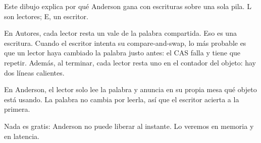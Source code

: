 Este dibujo explica por qué Anderson gana con escrituras sobre una sola pila. L son lectores; E, un escritor.

En Autores, cada lector resta un vale de la palabra compartida. Eso es una escritura. Cuando el escritor intenta su compare-and-swap, lo más probable es que un lector haya cambiado la palabra justo antes: el CAS falla y tiene que repetir. Además, al terminar, cada lector resta uno en el contador del objeto: hay dos líneas calientes.

En Anderson, el lector solo lee la palabra y anuncia en su propia mesa qué objeto está usando. La palabra no cambia por leerla, así que el escritor acierta a la primera.

Nada es gratis: Anderson no puede liberar al instante. Lo veremos en memoria y en latencia.
